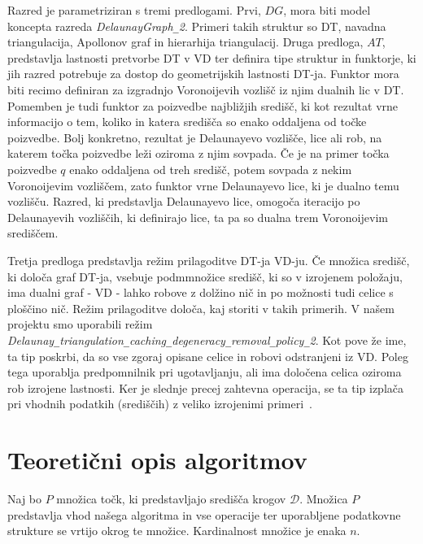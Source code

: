 \documentclass[a4paper, 12pt]{book}
\newcommand{\D}{\ensuremath{\mathcal{D}}}
\newcommand{\U}{\texttt{\_}}
\begin{document}
Razred je parametriziran s tremi predlogami. Prvi, $DG$, mora biti model koncepta razreda \textit{DelaunayGraph\U 2}. Primeri takih struktur so DT, navadna triangulacija, Apollonov graf in hierarhija triangulacij. Druga predloga, $AT$, predstavlja lastnosti pretvorbe DT v VD ter definira tipe struktur in funktorje, ki jih razred potrebuje za dostop do geometrijskih lastnosti DT-ja. Funktor mora biti recimo definiran za izgradnjo Voronoijevih vozlišč iz njim dualnih lic v DT. Pomemben je tudi funktor za poizvedbe najbližjih središč, ki kot rezultat vrne informacijo o tem, koliko in katera središča so enako oddaljena od točke poizvedbe. Bolj konkretno, rezultat je Delaunayevo vozlišče, lice ali rob, na katerem točka poizvedbe leži oziroma z njim sovpada. Če je na primer točka poizvedbe $q$ enako oddaljena od treh središč, potem sovpada z nekim Voronoijevim vozliščem, zato funktor vrne Delaunayevo lice, ki je dualno temu vozlišču. Razred, ki predstavlja Delaunayevo lice, omogoča iteracijo po Delaunayevih vozliščih, ki definirajo lice, ta pa so dualna trem Voronoijevim središčem.

Tretja predloga predstavlja režim prilagoditve DT-ja VD-ju. 
Če množica središč, ki določa graf DT-ja, vsebuje podmmnožice središč, ki so v izrojenem položaju, ima dualni graf - VD - lahko robove z dolžino nič in po možnosti tudi celice s ploščino nič. Režim prilagoditve določa, kaj storiti v takih primerih. V našem projektu smo uporabili režim \textit{Delaunay\U triangulation\U ca\-ching\U de\-ge\-ne\-ra\-cy\U re\-mo\-val\U po\-licy\U 2}. Kot pove že ime, ta tip poskrbi, da so vse zgoraj opisane celice in robovi odstranjeni iz VD. Poleg tega uporablja predpomnilnik pri ugotavljanju, ali ima določena celica oziroma rob izrojene lastnosti. Ker je slednje precej zahtevna operacija, se ta tip izplača pri vhodnih podatkih (središčih) z veliko izrojenimi primeri~\cite{cgal:k-vda2-15a}.






\chapter{Teoretični opis algoritmov}
Naj bo $P$ množica točk, ki predstavljajo središča krogov $\D$. Množica $P$ predstavlja vhod našega algoritma in vse operacije ter uporabljene podatkovne strukture se vrtijo okrog te množice. Kardinalnost množice je enaka $n$.
\end{document}
